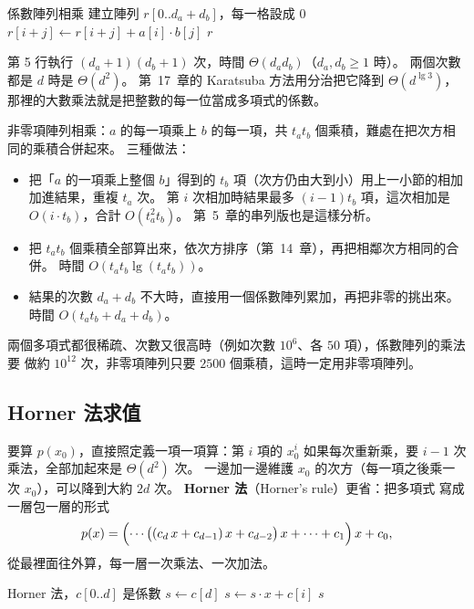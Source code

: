 \begin{pseudo}[label=alg:arr-poly-mul]{係數陣列相乘}
    \State 建立陣列 $r[0..d_a + d_b]$，每一格設成 $0$
            \State $r[i + j] \gets r[i + j] + a[i] \cdot b[j]$
        \EndFor
    \EndFor
    \State \Return $r$
\EndFunction
\end{pseudo}

第 5 行執行 $(d_a + 1)(d_b + 1)$ 次，時間 $\Theta(d_a d_b)$（$d_a, d_b \ge 1$ 時）。
兩個次數都是 $d$ 時是 $\Theta(d^2)$。 第~17~章的 Karatsuba 方法用分治把它降到
$\Theta(d^{\lg 3})$，那裡的大數乘法就是把整數的每一位當成多項式的係數。

非零項陣列相乘：$a$ 的每一項乘上 $b$ 的每一項，共 $t_a t_b$ 個乘積，難處在把次方相
同的乘積合併起來。 三種做法：

\begin{itemize}
\item 把「$a$ 的一項乘上整個 $b$」得到的 $t_b$ 項（次方仍由大到小）用上一小節的相加
加進結果，重複 $t_a$ 次。 第 $i$ 次相加時結果最多 $(i - 1)t_b$ 項，這次相加是
$O(i \cdot t_b)$，合計 $O(t_a^2 t_b)$。 第~5~章的串列版也是這樣分析。
\item 把 $t_a t_b$ 個乘積全部算出來，依次方排序（第~14~章），再把相鄰次方相同的合
併。 時間 $O(t_a t_b \lg(t_a t_b))$。
\item 結果的次數 $d_a + d_b$ 不大時，直接用一個係數陣列累加，再把非零的挑出來。 時間
$O(t_a t_b + d_a + d_b)$。
\end{itemize}

兩個多項式都很稀疏、次數又很高時（例如次數 $10^6$、各 $50$ 項），係數陣列的乘法要
做約 $10^{12}$ 次，非零項陣列只要 $2500$ 個乘積，這時一定用非零項陣列。

\subsection{Horner 法求值}

要算 $p(x_0)$，直接照定義一項一項算：第 $i$ 項的 $x_0^i$ 如果每次重新乘，要 $i - 1$
次乘法，全部加起來是 $\Theta(d^2)$ 次。 一邊加一邊維護 $x_0$ 的次方（每一項之後乘一
次 $x_0$），可以降到大約 $2d$ 次。 \textbf{Horner 法}（Horner's rule）更省：把多項式
寫成一層包一層的形式
\[
p(x) = \Bigl(\cdots\bigl((c_d\,x + c_{d-1})\,x + c_{d-2}\bigr)\,x + \cdots + c_1\Bigr)\,x + c_0 ,
\]
從最裡面往外算，每一層一次乘法、一次加法。

\begin{pseudo}[label=alg:arr-horner]{Horner 法，$c[0..d]$ 是係數}
    \State $s \gets c[d]$
        \State $s \gets s \cdot x + c[i]$
    \EndFor
    \State \Return $s$
\EndFunction
\end{pseudo}

